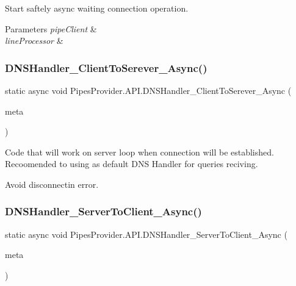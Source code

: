 Start saftely async waiting connection operation. 


\begin{DoxyParams}{Parameters}
{\em pipe\+Client} & \\
\hline
{\em line\+Processor} & \\
\hline
\end{DoxyParams}
\mbox{\label{class_pipes_provider_1_1_a_p_i_ade8af5541a5787e55fe07bad71298132}} 
\subsubsection{\texorpdfstring{D\+N\+S\+Handler\+\_\+\+Client\+To\+Serever\+\_\+\+Async()}{DNSHandler\_ClientToSerever\_Async()}}
{\footnotesize\ttfamily static async void Pipes\+Provider.\+A\+P\+I.\+D\+N\+S\+Handler\+\_\+\+Client\+To\+Serever\+\_\+\+Async (\begin{DoxyParamCaption}\item[{\mbox{\hyperlink{class_pipes_provider_1_1_server_transmission_meta}{Pipes\+Provider.\+Server\+Transmission\+Meta}}}]{meta }\end{DoxyParamCaption})\hspace{0.3cm}{\ttfamily [static]}}



Code that will work on server loop when connection will be established. Recoomended to using as default D\+NS Handler for queries reciving. 

Avoid disconnectin error. \mbox{\label{class_pipes_provider_1_1_a_p_i_af1648503e83d5ecd72af553ea5d461f5}} 
\subsubsection{\texorpdfstring{D\+N\+S\+Handler\+\_\+\+Server\+To\+Client\+\_\+\+Async()}{DNSHandler\_ServerToClient\_Async()}}
{\footnotesize\ttfamily static async void Pipes\+Provider.\+A\+P\+I.\+D\+N\+S\+Handler\+\_\+\+Server\+To\+Client\+\_\+\+Async (\begin{DoxyParamCaption}\item[{\mbox{\hyperlink{class_pipes_provider_1_1_server_transmission_meta}{Pipes\+Provider.\+Server\+Transmission\+Meta}}}]{meta }\end{DoxyParamCaption})\hspace{0.3cm}{\ttfamily [static]}}



